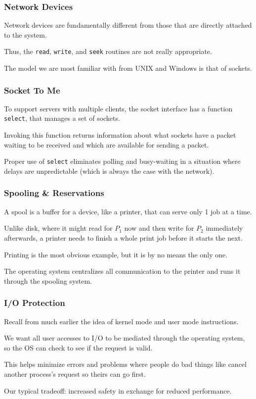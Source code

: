 \begin{frame}
\frametitle{Network Devices}

Network devices are fundamentally different from those that are directly attached to the system. 

Thus, the \texttt{read}, \texttt{write}, and \texttt{seek} routines are not really appropriate. 

The model we are most familiar with from UNIX and Windows is that of \alert{sockets}.


\end{frame}


\begin{frame}
\frametitle{Socket To Me}

To support servers with multiple clients, the socket interface has a function \texttt{select}, that manages a set of sockets. 

Invoking this function returns information about what sockets have a packet waiting to be received and which are available for sending a packet. 

Proper use of \texttt{select} eliminates polling and busy-waiting in a situation where delays are unpredictable (which is always the case with the network).


\end{frame}

\begin{frame}
\frametitle{Spooling \& Reservations}

A \alert{spool} is a buffer for a device, like a printer, that can serve only 1 job at a time. 

Unlike disk, where it might read for $P_{1}$ now and then write for $P_{2}$ immediately afterwards, a printer needs to finish a whole print job before it starts the next. 

Printing is the most obvious example, but it is by no means the only one. 

The operating system centralizes all communication to the printer and runs it through the spooling system. 


\end{frame}



\begin{frame}
\frametitle{I/O Protection}

Recall from much earlier the idea of kernel mode and user mode instructions. 

We want all user accesses to I/O to be mediated through the operating system, so the OS can check to see if the request is valid. 

This helps minimize errors and problems where people do bad things like cancel another process's request so theirs can go first. 

Our typical tradeoff: increased safety in exchange for reduced performance.



\end{frame}

